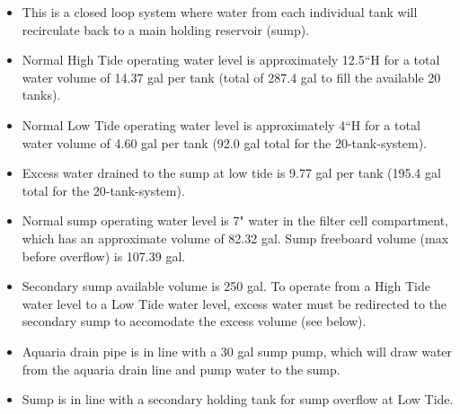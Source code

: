 \documentclass[]{book}
\providecommand{\tightlist}{%
  \setlength{\itemsep}{0pt}\setlength{\parskip}{0pt}}
\begin{document}
\begin{itemize}
\tightlist
\item
  This is a closed loop system where water from each individual tank
  will recirculate back to a main holding reservoir (sump).\\
\item
  Normal High Tide operating water level is approximately 12.5``H for a
  total water volume of 14.37 gal per tank (total of 287.4 gal to fill
  the available 20 tanks).\\
\item
  Normal Low Tide operating water level is approximately 4``H for a
  total water volume of 4.60 gal per tank (92.0 gal total for the
  20-tank-system).\\
\item
  Excess water drained to the sump at low tide is 9.77 gal per tank
  (195.4 gal total for the 20-tank-system).\\
\item
  Normal sump operating water level is 7" water in the filter cell
  compartment, which has an approximate volume of 82.32 gal. Sump
  freeboard volume (max before overflow) is 107.39 gal.\\
\item
  Secondary sump available volume is 250 gal. To operate from a High
  Tide water level to a Low Tide water level, excess water must be
  redirected to the secondary sump to accomodate the excess volume (see
  below).\\
\item
  Aquaria drain pipe is in line with a 30 gal sump pump, which will draw
  water from the aquaria drain line and pump water to the sump.\\
\item
  Sump is in line with a secondary holding tank for sump overflow at Low
  Tide.


\end{itemize}
\end{document}
